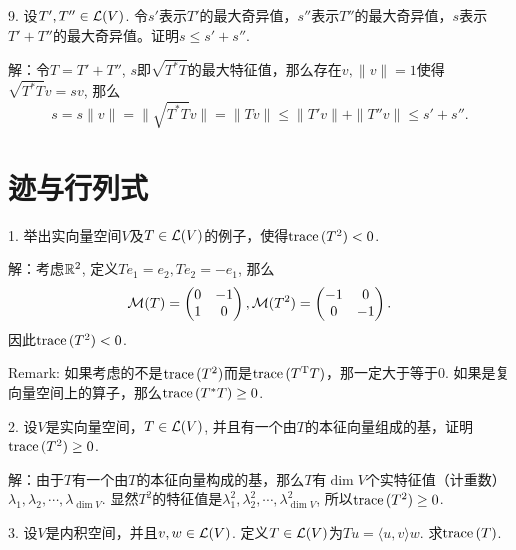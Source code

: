 \documentclass[hyperref,]{ctexart}
\begin{document}
\bigskip

\noindent{} 9. 设\(T',T''\in\mathcal{L}(V)\).
令\(s'\)表示\(T'\)的最大奇异值，\(s''\)表示\(T''\)的最大奇异值，\(s\)表示\(T'+T''\)的最大奇异值。证明\(s\le s'+s''\).

\smallskip

\noindent{} 解：令\(T=T'+T''\),
\(s\)即\(\sqrt{T^*T}\)的最大特征值，那么存在\(v,\|v\|=1\)使得\(\sqrt{T^*T}v=sv\),
那么
\[s = s\|v\|=\|\sqrt{T^*T}v\|=\|Tv\|\le\|T'v\|+\|T''v\|\le s'+s''.\]

\bigskip

\section{迹与行列式}\label{ux8ff9ux4e0eux884cux5217ux5f0f}

\noindent{} 1.
举出实向量空间\(V\)及\(T\in\mathcal{L}(V)\)的例子，使得\(\mathrm{trace}\,(T^2)<0\).

\smallskip

\noindent{} 解：考虑\(\mathbb{R}^2\), 定义\(Te_1=e_2,Te_2=-e_1\), 那么 \[
\mathcal{M}(T)=\begin{pmatrix}
0&-1\\
1&0\\
\end{pmatrix},
\mathcal{M}(T^2)=\begin{pmatrix}
-1&0\\
0&-1\\
\end{pmatrix}.\] 因此\(\mathrm{trace}\,(T^2)<0\).

\smallskip

\noindent{} Remark:
如果考虑的不是\(\mathrm{trace}\,(T^2)\)而是\(\mathrm{trace}\,(T^{\mathrm{T}}T)\)，那一定大于等于0.
如果是复向量空间上的算子，那么\(\mathrm{trace}\,(T^*T)\ge 0\).

\bigskip

\noindent{} 2. 设\(V\)是实向量空间，\(T\in\mathcal{L}(V)\),
并且有一个由\(T\)的本征向量组成的基，证明\(\mathrm{trace}\,(T^2)\ge 0\).

\smallskip

\noindent{}
解：由于\(T\)有一个由\(T\)的本征向量构成的基，那么\(T\)有\(\dim V\)个实特征值（计重数）\(\lambda_1,\lambda_2,\cdots,\lambda_{\dim V}\).
显然\(T^2\)的特征值是\(\lambda_1^2,\lambda_2^2,\cdots,\lambda_{\dim V}^2\),
所以\(\mathrm{trace}\,(T^2)\ge 0\).

\bigskip

\noindent{} 3. 设\(V\)是内积空间，并且\(v,w\in\mathcal{L}(V)\).
定义\(T\in\mathcal{L}(V)\)为\(Tu=\langle u,v\rangle w\). 求\(\mathrm{trace}\,(T)\).

\smallskip
\end{document}
